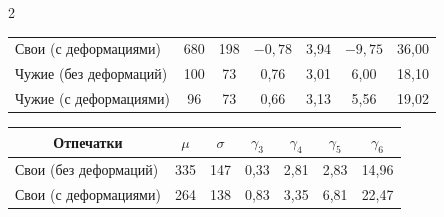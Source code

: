 \begin{multicols}{2}
\begin{table}
\begin{center}
\begin{tabular}{|l|c|c|c|c|c|c|}
Свои (с деформациями) &680&198&$-0{,}78$&3,94&$-9{,}75$&36,00\\


Чужие (без деформаций)&100&\hphantom{9}73&\hphantom{9,}0,76&3,01&\hphantom{9,}6,00&18,10\\


Чужие (с деформациями)&\hphantom{9}96&\hphantom{9}73&\hphantom{9,}0,66&3,13&\hphantom{9,}5,56&19,02\\


\hline


\end{tabular}


\end{center}


\end{table}








\begin{table}\small


\begin{center}


\parbox{105mm}{





}





\vspace*{2ex}





\tabcolsep=6.4pt


\begin{tabular}{|l|c|c|c|c|c|c|}


\hline


\multicolumn{1}{|c|}{Отпечатки}&$\mu$&$\sigma$&$\gamma_3$&$\gamma_4$&$\gamma_5$&$\gamma_6$\\


\hline


Свои (без деформаций)&335&147&0,33&2,81&\hphantom{9}2,83&\hphantom{9}14,96\\


Свои (с деформациями) &264&138&0,83&3,35&\hphantom{9}6,81&\hphantom{9}22,47\\



\end{tabular}
\end{center}
\end{table}
\end{multicols}
